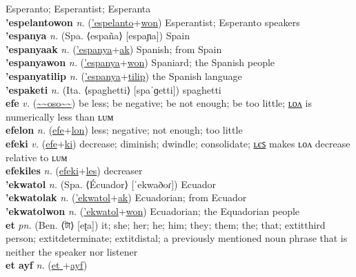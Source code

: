 Esperanto; Esperantist; Esperanta \label{'espelantoak} \\
\textbf{'espelantowon} \textit{n.} (\hyperref['espelanto]{'espelanto}+\hyperref[won]{won})
Esperantist; Esperanto speakers \label{'espelantowon} \\
\textbf{'espanya} \textit{n.} (Spa. ⟨españa⟩ [espaɲa])
Spain \label{'espanya} \\
\textbf{'espanyaak} \textit{n.} (\hyperref['espanya]{'espanya}+\hyperref[ak]{ak})
Spanish; from Spain \label{'espanyaak} \\
\textbf{'espanyawon} \textit{n.} (\hyperref['espanya]{'espanya}+\hyperref[won]{won})
Spaniard; the Spanish people \label{'espanyawon} \\
\textbf{'espanyatilip} \textit{n.} (\hyperref['espanya]{'espanya}+\hyperref[tilip]{tilip})
the Spanish language \label{'espanyatilip} \\
\textbf{'espaketi} \textit{n.} (Ita. ⟨spaghetti⟩ [spaˈɡetti])
spaghetti \label{'espaketi} \\
\textbf{efe} \textit{v.} (\hyperref[oso]{\~{}\~{}oso\~{}\~{}})
be less; be negative; be not enough; be too little; \hyperref[efelon]{ʟᴏᴧ} is numerically less than ʟᴜᴍ \label{efe} \\
\textbf{efelon} \textit{n.} (\hyperref[efe]{efe}+\hyperref[lon]{lon})
less; negative; not enough; too little \label{efelon} \\
\textbf{efeki} \textit{v.} (\hyperref[efe]{efe}+\hyperref[ki]{ki})
decrease; diminish; dwindle; consolidate; \hyperref[efekiles]{ʟєꜱ} makes ʟᴏᴧ decrease relative to ʟᴜᴍ \label{efeki} \\
\textbf{efekiles} \textit{n.} (\hyperref[efeki]{efeki}+\hyperref[les]{les})
decreaser \label{efekiles} \\
\textbf{'ekwatol} \textit{n.} (Spa. ⟨Écuador⟩ [ˈekwaðoɾ])
Ecuador \label{'ekwatol} \\
\textbf{'ekwatolak} \textit{n.} (\hyperref['ekwatol]{'ekwatol}+\hyperref[ak]{ak})
Ecuadorian; from Ecuador \label{'ekwatolak} \\
\textbf{'ekwatolwon} \textit{n.} (\hyperref['ekwatol]{'ekwatol}+\hyperref[won]{won})
Ecuadorian; the Equadorian people \label{'ekwatolwon} \\
\textbf{et} \textit{pn.} (Ben. ⟨টা⟩ [eʈa])
it; she; her; he; him; they; them; the; that; 	extit{third person}; 	extit{determinate}; 	extit{distal}; a previously mentioned noun phrase that is neither the speaker nor listener \label{et} \\
\textbf{et ayf} \textit{n.} (\hyperref[et ]{et }+\hyperref[yf]{ayf})
